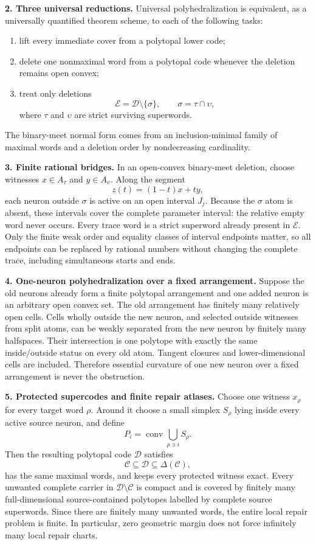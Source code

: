 \documentclass[10pt]{article}
\newcommand{\conv}{\operatorname{conv}}
\begin{document}
\textbf{2. Three universal reductions.}
Universal polyhedralization is equivalent, as a universally quantified theorem scheme, to each of the following tasks:
\begin{enumerate}[leftmargin=5mm,itemsep=1pt,topsep=1pt]
\item lift every immediate cover from a polytopal lower code;
\item delete one nonmaximal word from a polytopal code whenever the deletion remains open convex;
\item treat only deletions
\[
 \mathcal E=\mathcal D\setminus\{\sigma\},
 \qquad \sigma=\tau\cap\upsilon,
\]
where $\tau$ and $\upsilon$ are strict surviving superwords.
\end{enumerate}
The binary-meet normal form comes from an inclusion-minimal family of maximal words and a deletion order by nondecreasing cardinality.

\newpage
\textbf{3. Finite rational bridges.}
In an open-convex binary-meet deletion, choose witnesses $x\in A_\tau$ and $y\in A_\upsilon$.  Along the segment
\[
 z(t)=(1-t)x+ty,
\]
each neuron outside $\sigma$ is active on an open interval $J_j$.  Because the $\sigma$ atom is absent, these intervals cover the complete parameter interval: the relative empty word never occurs.  Every trace word is a strict superword already present in $\mathcal E$.  Only the finite weak order and equality classes of interval endpoints matter, so all endpoints can be replaced by rational numbers without changing the complete trace, including simultaneous starts and ends.

\textbf{4. One-neuron polyhedralization over a fixed arrangement.}
Suppose the old neurons already form a finite polytopal arrangement and one added neuron is an arbitrary open convex set.  The old arrangement has finitely many relatively open cells.  Cells wholly outside the new neuron, and selected outside witnesses from split atoms, can be weakly separated from the new neuron by finitely many halfspaces.  Their intersection is one polytope with exactly the same inside/outside status on every old atom.  Tangent closures and lower-dimensional cells are included.  Therefore essential curvature of one new neuron over a fixed arrangement is never the obstruction.

\textbf{5. Protected supercodes and finite repair atlases.}
Choose one witness $x_\rho$ for every target word $\rho$.  Around it choose a small simplex $S_\rho$ lying inside every active source neuron, and define
\[
 P_i=\conv\bigcup_{\rho\ni i}S_\rho.
\]
Then the resulting polytopal code $\mathcal D$ satisfies
\[
 \mathcal C\subseteq\mathcal D\subseteq\Delta(\mathcal C),
\]
has the same maximal words, and keeps every protected witness exact.  Every unwanted complete carrier in $\mathcal D\setminus\mathcal C$ is compact and is covered by finitely many full-dimensional source-contained polytopes labelled by complete source superwords.  Since there are finitely many unwanted words, the entire local repair problem is finite.  In particular, zero geometric margin does not force infinitely many local repair charts.
\end{document}

